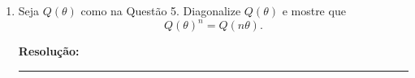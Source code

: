 \documentclass[leqno]{article}
\numberwithin{equation}{section}
\newenvironment{sol} 
{
    \vspace{4mm}
    \noindent\textbf{Resolução:}
    \strut\newline
    \smallskip
    \hspace{-3.5mm} 
} 
{\noindent\rule{4cm}{.1mm}}
\begin{document}
\begin{enumerate}
\begin{sol}
\end{sol}



\item Seja $Q(\theta)$ como na Questão 5. Diagonalize $Q(\theta)$ e mostre que
$$Q(\theta)^n = Q(n\theta).$$

\begin{sol}


\end{sol}
\end{enumerate}
\end{document}
